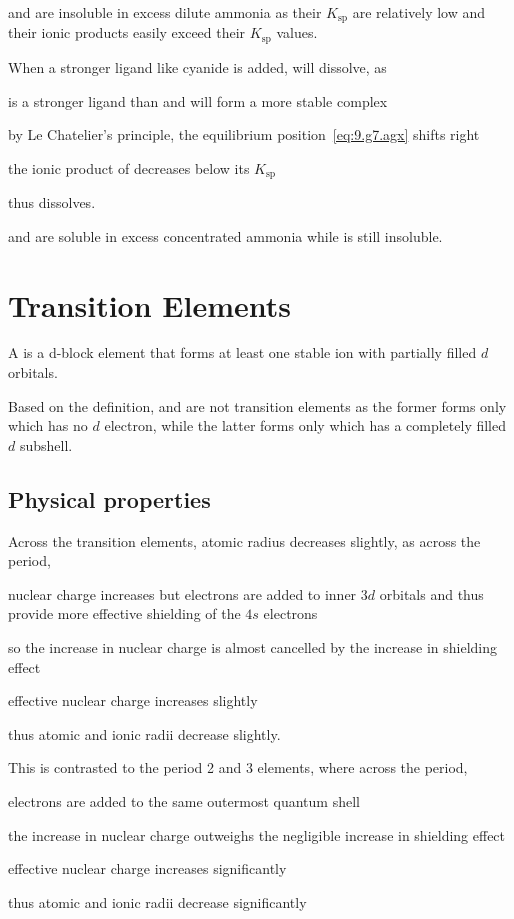 \documentclass[Chemistry.tex]{subfiles}
\begin{document}
 and  are insoluble in excess dilute ammonia as their \(K_\text{sp}\) are relatively low and their ionic products easily exceed their \(K_\text{sp}\) values.

When a stronger ligand like cyanide is added,  will dissolve, as \begin{slinenum}
\item {} is a stronger ligand than  and will form a more stable complex \slch{[Ag(CN)2]^-}
\item by Le Chatelier's principle, the equilibrium position~\eqref{eq:9.g7.agx} shifts right
\item the ionic product of  decreases below its \(K_\text{sp}\)
\item thus  dissolves.
\end{slinenum}

 and  are soluble in excess concentrated ammonia while  is still insoluble.
\section{Transition Elements}
A  is a d-block element that forms at least one stable ion with partially filled \(d\) orbitals.

Based on the definition,  and  are not transition elements as the former forms only  which has no \(d\) electron, while the latter forms only  which has a completely filled \(d\) subshell.
\subsection{Physical properties}
Across the transition elements, atomic radius decreases slightly, as across the period, \begin{slinenum}
\item nuclear charge increases but electrons are added to inner \(3d\) orbitals and thus provide more effective shielding of the \(4s\) electrons
\item so the increase in nuclear charge is almost cancelled by the increase in shielding effect
\item effective nuclear charge increases slightly
\item thus atomic and ionic radii decrease slightly.
\end{slinenum}

This is contrasted to the period 2 and 3 elements, where across the period, \begin{slinenum}
\item electrons are added to the same outermost quantum shell
\item the increase in nuclear charge outweighs the negligible increase in shielding effect
\item effective nuclear charge increases significantly
\item thus atomic and ionic radii decrease significantly
\end{slinenum}
\end{document}
